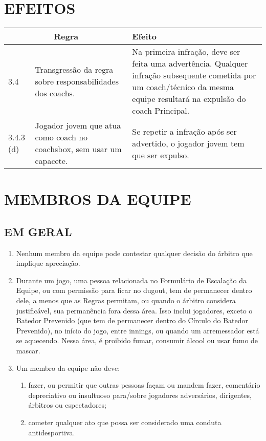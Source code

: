 \section*{EFEITOS}

{\footnotesize
	\begin{tabular}{p{}p{}|p{}}
		\multicolumn{2}{c|}{Regra} & Efeito \\\hline\hline 
		
		3.4 & Transgress\~ao da regra sobre responsabilidades dos \glspl{coach}. &
		Na primeira infra\c{c}\~ao, deve ser feita uma advert\^encia. Qualquer infra\c{c}\~ao subsequente cometida por um \gls{coach}/t\'ecnico da mesma equipe resultar\'a na expuls\~ao do \Gls{coach} Principal. 
		\\\hline
		3.4.3 (d) & Jogador jovem que atua como \gls{coach} no \gls{coachsbox}, sem usar um capacete. &
		Se repetir a infra\c{c}\~ao ap\'os ser advertido, o jogador jovem tem que ser expulso. \\\hline
\end{tabular}}

\section{MEMBROS DA EQUIPE} 

\subsection{EM GERAL} 
	\begin{multicols}{2}
		\begin{enumerate}[label=\alph*)]
			\item Nenhum membro da equipe pode contestar qualquer decis\~ao do \'arbitro que implique aprecia\c{c}\~ao. 
			
			\item  Durante um jogo, uma pessoa relacionada no Formul\'ario de Escala\c{c}\~ao da Equipe, ou com permiss\~ao para ficar no \Gls{dugout}, tem de permanecer dentro dele, a menos que as Regras permitam, ou quando o \'arbitro considera justific\'avel, sua perman\^encia fora dessa \'area. Isso inclui jogadores, exceto o Batedor Prevenido (que tem de permanecer dentro do C\'irculo do Batedor Prevenido), no in\'icio do jogo, entre \glspl{inning}, ou quando um arremessador est\'a se aquecendo. Nessa \'area, \'e proibido fumar, consumir \'alcool ou usar fumo de mascar. 
			
			\item  Um membro da equipe n\~ao deve: 
			\begin{enumerate}[label=\roman* -]
				\item fazer, ou permitir que outras pessoas fa\c{c}am ou mandem fazer, coment\'ario depreciativo ou insultuoso para/sobre jogadores advers\'arios, dirigentes, \'arbitros ou espectadores; 
				\item cometer qualquer ato que possa ser considerado uma conduta antidesportiva. 
			\end{enumerate}
		\end{enumerate}
		
	\end{multicols}
